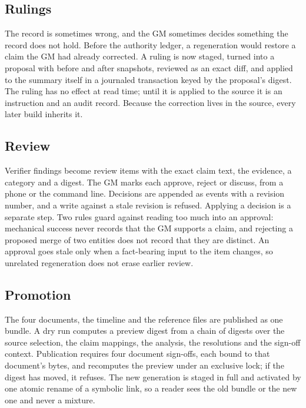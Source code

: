 \documentclass[11pt]{article}
\begin{document}
\subsection{Rulings}

The record is sometimes wrong, and the GM sometimes decides something the record does
not hold. Before the authority ledger, a regeneration would restore a claim the GM had
already corrected. A ruling is now staged, turned into a proposal with before and after
snapshots, reviewed as an exact diff, and applied to the summary itself in a journaled
transaction keyed by the proposal's digest. The ruling has no effect at read time; until
it is applied to the source it is an instruction and an audit record. Because the
correction lives in the source, every later build inherits it.

\subsection{Review}
\label{sec:review}

Verifier findings become review items with the exact claim text, the evidence, a
category and a digest. The GM marks each approve, reject or discuss, from a phone or the
command line. Decisions are appended as events with a revision number, and a write
against a stale revision is refused. Applying a decision is a separate step. Two rules
guard against reading too much into an approval: mechanical success never records that
the GM supports a claim, and rejecting a proposed merge of two entities does not record
that they are distinct. An approval goes stale only when a fact-bearing input to the item
changes, so unrelated regeneration does not erase earlier review.

\subsection{Promotion}

The four documents, the timeline and the reference files are published as one bundle.
A dry run computes a preview digest from a chain of digests over the source selection,
the claim mappings, the analysis, the resolutions and the sign-off context. Publication
requires four document sign-offs, each bound to that document's bytes, and recomputes
the preview under an exclusive lock; if the digest has moved, it refuses. The new
generation is staged in full and activated by one atomic rename of a symbolic link, so a
reader sees the old bundle or the new one and never a mixture.
\end{document}
